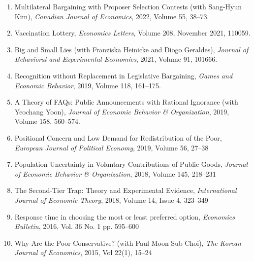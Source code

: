 \documentclass[margin, a4paper]{res}
\begin{document}
\begin{resume}
\begin{enumerate}[leftmargin=*]
\item Multilateral Bargaining with Proposer Selection Contests (with Sang-Hyun Kim), \emph{Canadian Journal of Economics}, 2022, Volume 55, 38--73.
\item Vaccination Lottery, \emph{Economics Letters}, Volume 208, November 2021, 110059.
\item Big and Small Lies (with Franziska Heinicke and Diogo Geraldes), \emph{Journal of Behavioral and Experimental Economics}, 2021, Volume 91, 101666.
\item Recognition without Replacement in Legislative Bargaining, \emph{Games and Economic Behavior}, 2019, Volume 118, 161--175.
\item A Theory of FAQs: Public Announcements with Rational Ignorance (with Yeochang Yoon), \emph{Journal of Economic Behavior \& Organization}, 2019, Volume 158, 560--574.
\item Positional Concern and Low Demand for Redistribution of the Poor, \emph{European Journal of Political Economy}, 2019, Volume 56, 27--38
\item Population Uncertainty in Voluntary Contributions of Public Goods, \emph{Journal of Economic Behavior \& Organization}, 2018, Volume 145, 218--231
\item The Second-Tier Trap: Theory and Experimental Evidence, \emph{International Journal of Economic Theory}, 2018, Volume 14, Issue 4, 323--349
\item Response time in choosing the most or least preferred option, \textit{Economics Bulletin}, 2016, Vol. 36 No. 1 pp. 595--600
\item Why Are the Poor Conservative? (with Paul Moon Sub Choi), \textit{The Korean Journal of Economics}, 2015, Vol 22(1), 15--24
\end{enumerate}


\end{resume}
\end{document}
